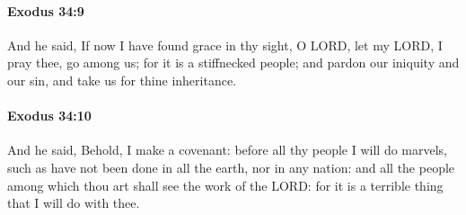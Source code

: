		\paragraph{Exodus 34:9} %
			\label{EXODUS-34-9}

			And he said, If now I have found grace in thy sight, O LORD, let my LORD, I pray thee, go among us; for it is a stiffnecked people; and pardon our iniquity and our sin, and take us for thine inheritance.


		\paragraph{Exodus 34:10} %
			\label{EXODUS-34-10}

			And he said, Behold, I make a covenant: before all thy people I will do marvels, such as have not been done in all the earth, nor in any nation: and all the people among which thou art shall see the work of the LORD: for it is a terrible thing that I will do with thee.

